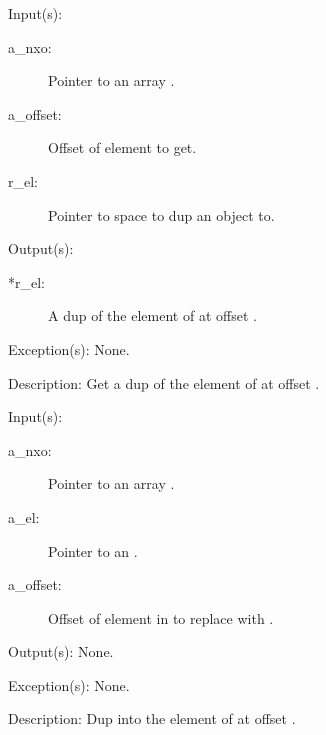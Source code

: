 \begin{capi}
\begin{capilist}
	\item[Input(s): ]
		\begin{description}\item[]
		\item[a\_nxo: ]
			Pointer to an array .
		\item[a\_offset: ]
			Offset of element to get.
		\item[r\_el: ]
			Pointer to space to dup an object to.
		\end{description}
	\item[Output(s): ]
		\begin{description}\item[]
		\item[*r\_el: ]
			A dup of the element of  at offset
			.
		\end{description}
	\item[Exception(s): ] None.
	\item[Description: ]
		Get a dup of the element of  at offset
		.
	\end{capilist}
\label{nxo_array_el_set}
	\begin{capilist}
	\item[Input(s): ]
		\begin{description}\item[]
		\item[a\_nxo: ]
			Pointer to an array .
		\item[a\_el: ]
			Pointer to an .
		\item[a\_offset: ]
			Offset of element in  to replace with
			.
		\end{description}
	\item[Output(s): ] None.
	\item[Exception(s): ] None.
	\item[Description: ]
		Dup  into the element of  at offset
		.
	\end{capilist}
\end{capi}
